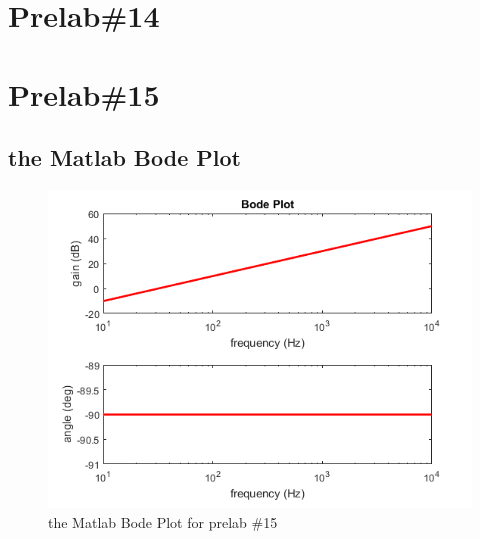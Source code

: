 \documentclass{IEEEtran}
\begin{document}
	\section{\textbf{Prelab\#14}}
	\section{\textbf{Prelab\#15}}
	\subsection{the Matlab Bode Plot}
	\begin{figure}[!htbp]
		\centering
		\begin{framed}
			\includegraphics[width=\linewidth]{images/15.png}
			\caption{the Matlab Bode Plot for prelab \#15}
			\label{fig:1501}
		\end{framed}
	\end{figure}
\end{document}
